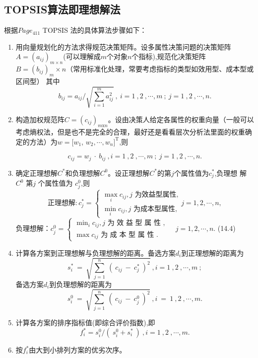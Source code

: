 \documentclass[12pt]{ctexart}
\numberwithin{equation}{section} %
\begin{document}
\subsection{TOPSIS算法即理想解法}
根据\cite{司守奎}$Page_{411}$
TOPSIS 法的具体算法步骤如下：
\begin{enumerate}
\item 用向量规划化的方法求得规范决策矩阵。设多属性决策问题的决策矩阵
$A=(a_{ij})_{m\times n}$(可以理解成$m$个对象$n$个指标),规范化决策矩阵 $B=(b_{ij})_m\times n$（常用标准化处理，常要考虑指标的类型如效用型、成本型或区间型）
其中
$$b_{ij}=a_{ij}\Big/\sqrt{\sum_{i=1}^{m}a_{ij}^{2}}\:,\:i=1\:,2\:,\cdots,m\:;\:j=1\:,2\:,\cdots,n.$$

\item 构造加权规范阵$C=(c_{ij})_{m\mathrm{x}n}$。设由决策人给定各属性的权重向量（一般可以考虑熵权法，但是也不是完全的合理，最好还是看看层次分析法里面的权重确定的方法）为$w=[w_1$,
$w_{2},\cdots,w_{n}]^{\mathrm{T}}$,则

$$c_{ij}=w_{j}\:\cdot\:b_{ij}\:,i=1\:,2\:,\cdots,m\:;\:j=1\:,2\:,\cdots,n.$$
\item 确定正理想解$C^{*}$和负理想解$C^{0}$。设正理想解$C^{*}$的第$j$个属性值为$c_j^{*}$,负理想
解 $C^{0}$ 第$j$ 个属性值为 $c_j^0$,则
$$\text{正理想解}:c_j^*=\begin{cases}\max_ic_{ij},j\text{ 为效益型属性,}\\\min_ic_{ij},j\text{ 为成本型属性,}\end{cases}j=1,2,\cdots,n,$$
负理想解：$c_j^0= \begin{cases} \min _ic_{ij}, j\text{ 为 效 益 型 属 性 , }\\ \max c_{ij}\text{ 为 成 本 型 属 性 }. & \end{cases} j= 1, 2, \cdots , n.$ (14.4)
\item 计算各方案到正理想解与负理想解的距离。备选方案$d_i$到正理想解的距离为
$$s_{i}^{*}\:=\:\sqrt{\sum_{j=1}^{n}\:(\:c_{ij}\:-\:c_{j}^{*}\:)^{2}}\:,i=1\:,2\:,\cdots,m\:;$$
备选方案$d_i$到负理想解的距离为
$$s_{i}^{0}\:=\:\sqrt{\sum_{j=1}^{n}\:(\:c_{ij}\:-\:c_{j}^{0}\:)^{2}}\:,i\:=\:1\:,2\:,\cdots,m.$$
\item 计算各方案的排序指标值(即综合评价指数),即
$$f_{i}^{*}=s_{i}^{0}/(\:s_{i}^{0}+s_{i}^{*}\:)\:,i=1\:,2\:,\cdots,m.$$
\item 按$f_i^*$由大到小排列方案的优劣次序。
\end{enumerate}
\end{document}
